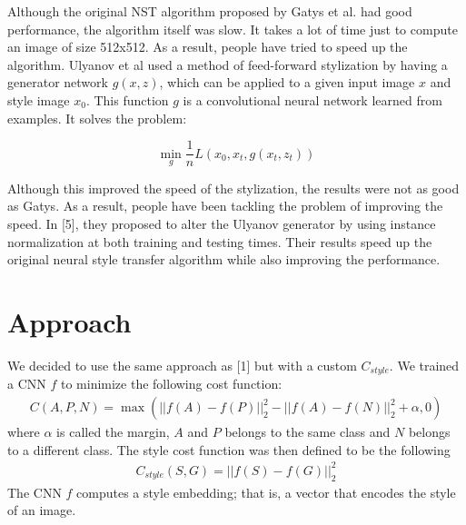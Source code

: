 \documentclass[runningheads]{llncs}
\newcommand{\distf}[2]{||f(#1)-f(#2)||_2^2}
\begin{document}
Although the original NST algorithm proposed by Gatys et al. had good performance, the algorithm itself was slow. It takes a lot of time just to compute an image of size 512x512. As a result, people have tried to speed up the algorithm. Ulyanov et al used a method of feed-forward stylization by having a generator network $g(x,z)$, which can be applied to a given input image $x$ and style image $x_0$. This function $g$ is a convolutional neural network learned from examples. It solves the problem: 

\begin{equation}
	\min_g \frac{1}{n} L(x_0, x_t, g(x_t, z_t))	
\end{equation}

Although this improved the speed of the stylization, the results were not as good as Gatys. As a result, people have been tackling the problem of improving the speed. In [5], they proposed to alter the Ulyanov generator by using instance normalization at both training and testing times. Their results speed up the original neural style transfer algorithm while also improving the performance.

\section{Approach}
We decided to use the same approach as [1] but with a custom $C_{style}$. We trained a CNN $f$ to minimize the following cost function:
\begin{gather}
	C(A,P,N) = \max(\distf{A}{P} - \distf{A}{N} + \alpha, 0)
\end{gather}
where $\alpha$ is called the margin, $A$ and $P$ belongs to the same class and $N$ belongs to a different class. The style cost function was then defined to be the following
\begin{gather}
	C_{style}(S,G) = \distf{S}{G}
\end{gather}
The CNN $f$ computes a style embedding; that is, a vector that encodes the style of an image.

\clearpage



\end{document}
